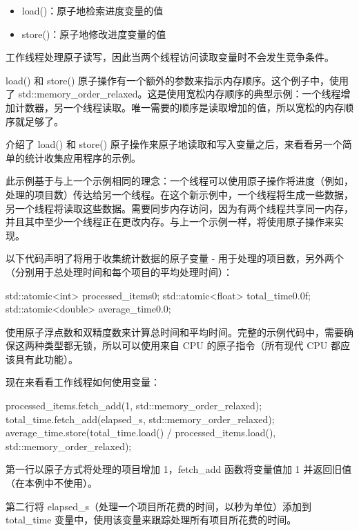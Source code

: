 \begin{itemize}
\item
load()：原子地检索进度变量的值

\item
store()：原子地修改进度变量的值
\end{itemize}

工作线程处理原子读写，因此当两个线程访问读取变量时不会发生竞争条件。

load() 和 store() 原子操作有一个额外的参数来指示内存顺序。这个例子中，使用了 std::memory\_order\_relaxed。这是使用宽松内存顺序的典型示例：一个线程增加计数器，另一个线程读取。唯一需要的顺序是读取增加的值，所以宽松的内存顺序就足够了。

介绍了 load() 和 store() 原子操作来原子地读取和写入变量之后，来看看另一个简单的统计收集应用程序的示例。


此示例基于与上一个示例相同的理念：一个线程可以使用原子操作将进度（例如，处理的项目数）传达给另一个线程。在这个新示例中，一个线程将生成一些数据，另一个线程将读取这些数据。需要同步内存访问，因为有两个线程共享同一内存，并且其中至少一个线程正在更改内存。与上一个示例一样，将使用原子操作来实现。

以下代码声明了将用于收集统计数据的原子变量 - 用于处理的项目数，另外两个（分别用于总处理时间和每个项目的平均处理时间）：

\begin{cpp}
std::atomic<int> processed_items{0};
std::atomic<float> total_time{0.0f};
std::atomic<double> average_time{0.0};
\end{cpp}

使用原子浮点数和双精度数来计算总时间和平均时间。完整的示例代码中，需要确保这两种类型都无锁，所以可以使用来自 CPU 的原子指令（所有现代 CPU 都应该具有此功能）。

现在来看看工作线程如何使用变量：

\begin{cpp}
processed_items.fetch_add(1, std::memory_order_relaxed);
total_time.fetch_add(elapsed_s, std::memory_order_relaxed);
average_time.store(total_time.load() / processed_items.load(),
std::memory_order_relaxed);
\end{cpp}

第一行以原子方式将处理的项目增加 1，fetch\_add 函数将变量值加 1 并返回旧值（在本例中不使用）。

第二行将 elapsed\_s（处理一个项目所花费的时间，以秒为单位）添加到 total\_time 变量中，使用该变量来跟踪处理所有项目所花费的时间。

